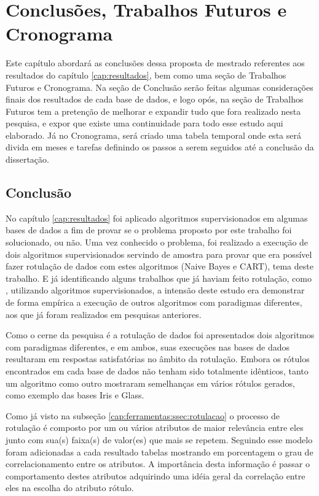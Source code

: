 \chapter{Conclusões, Trabalhos Futuros e Cronograma}\label{cap:conclusao} 

Este capítulo abordará as conclusões dessa  proposta de mestrado referentes aos resultados do capítulo \ref{cap:resultados},  bem como uma seção de Trabalhos Futuros e  Cronograma. Na seção de Conclusão serão feitas algumas considerações finais dos resultados de cada base de dados, e logo opós, na seção de Trabalhos Futuros tem a pretenção de melhorar e expandir tudo que fora realizado  nesta pesquisa, e expor que existe uma continuidade para todo esse estudo aqui elaborado. Já no Cronograma, será criado uma tabela temporal onde esta será divida em meses e tarefas definindo os passos a serem seguidos até a conclusão da dissertação.

\section{Conclusão}\label{cond}
No capítulo \ref{cap:resultados} foi aplicado algoritmos supervisionados em algumas bases de dados a fim de provar se o problema proposto por este  trabalho foi solucionado, ou não. Uma vez conhecido o problema, foi realizado a execução de dois algoritmos supervisionados servindo de amostra para provar que era possível fazer rotulação de dados com estes algoritmos (Naive Bayes e CART), tema deste trabalho. E já identificando alguns trabalhos que já haviam feito rotulação, como , utilizando algoritmos supervisionados, a intensão deste estudo era demonstrar de forma empírica a execução de outros algoritmos com paradigmas diferentes, aos que já foram realizados em pesquisas anteriores. 

Como o cerne da pesquisa é a rotulação de dados foi apresentados dois algoritmos com paradigmas diferentes, e em ambos, suas execuções nas bases de dados resultaram em respostas satisfatórias no âmbito da rotulação. Embora os rótulos encontrados  em cada base de dados não tenham sido totalmente idênticos, tanto um algoritmo como outro mostraram semelhanças em vários rótulos gerados, como exemplo das bases Iris e Glass.

Como já visto na subseção \ref{cap:ferramentas:ssec:rotulacao} o processo de rotulação é composto por um ou vários atributos de maior relevância entre eles junto com sua(s) faixa(s) de valor(es) que mais se repetem. Seguindo esse modelo foram adicionadas a cada resultado tabelas mostrando em porcentagem o grau de correlacionamento entre os atributos. A importância desta informação é passar o comportamento destes atributos adquirindo uma idéia geral da correlação entre eles na escolha do atributo rótulo.

